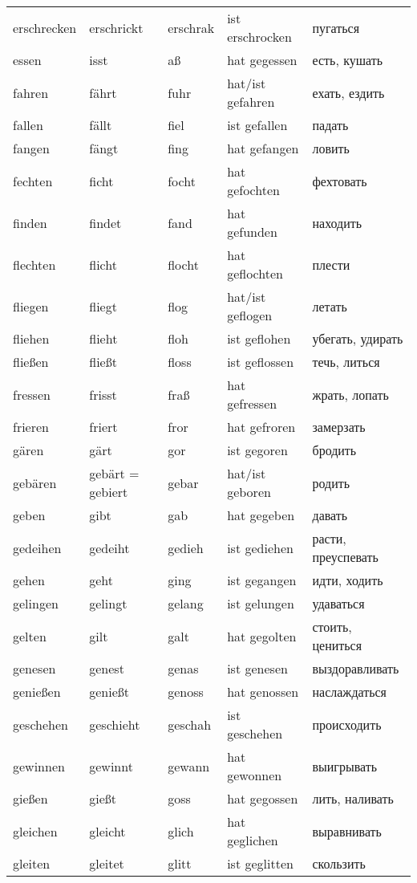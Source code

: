 \begin{longtable}{|l|l|l|l|l|}
erschrecken & erschrickt & erschrak & ist erschrocken & пугаться \\
essen & isst & a\ss  & hat gegessen & есть, кушать \\
fahren & f\"ahrt & fuhr & hat/ist gefahren & ехать, ездить \\
fallen & f\"allt & fiel & ist gefallen & падать \\
fangen & f\"angt & fing & hat gefangen & ловить \\
fechten & ficht & focht & hat gefochten & фехтовать \\
finden & findet & fand & hat gefunden & находить \\
flechten & flicht & flocht & hat geflochten & плести \\
fliegen & fliegt & flog & hat/ist geflogen & летать \\
fliehen & flieht & floh & ist geflohen & убегать, удирать \\
flie\ss en & flie\ss t & floss & ist geflossen & течь, литься \\
fressen & frisst & fra\ss  & hat gefressen & жрать, лопать \\
frieren & friert & fror & hat gefroren & замерзать \\
g\"aren & g\"art & gor & ist gegoren & бродить \\
geb\"aren & geb\"art = gebiert & gebar & hat/ist geboren & родить \\
geben & gibt & gab & hat gegeben & давать \\
gedeihen & gedeiht & gedieh & ist gediehen & расти, преуспевать \\
gehen & geht & ging & ist gegangen & идти, ходить \\
gelingen & gelingt & gelang & ist gelungen & удаваться \\
gelten & gilt & galt & hat gegolten & стоить, цениться \\
genesen & genest & genas & ist genesen & выздоравливать \\
genie\ss en & genie\ss t & genoss & hat genossen & наслаждаться \\
geschehen & geschieht & geschah & ist geschehen & происходить \\
gewinnen & gewinnt & gewann & hat gewonnen & выигрывать \\
gie\ss en & gie\ss t & goss & hat gegossen & лить, наливать \\
gleichen & gleicht & glich & hat geglichen & выравнивать \\
gleiten & gleitet & glitt & ist geglitten & скользить \\

\end{longtable}
